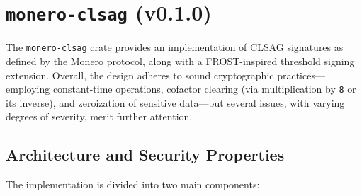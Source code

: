 \documentclass[12pt,a4paper]{article}
\begin{document}
\section{\texttt{monero-clsag} (v0.1.0)}
The \texttt{monero-clsag} crate provides an implementation of CLSAG signatures as defined by the Monero protocol, along with a FROST-inspired threshold signing extension. Overall, the design adheres to sound cryptographic practices—employing constant-time operations, cofactor clearing (via multiplication by \texttt{8} or its inverse), and zeroization of sensitive data—but several issues, with varying degrees of severity, merit further attention.

\subsection{Architecture and Security Properties}
The implementation is divided into two main components:
\end{document}
